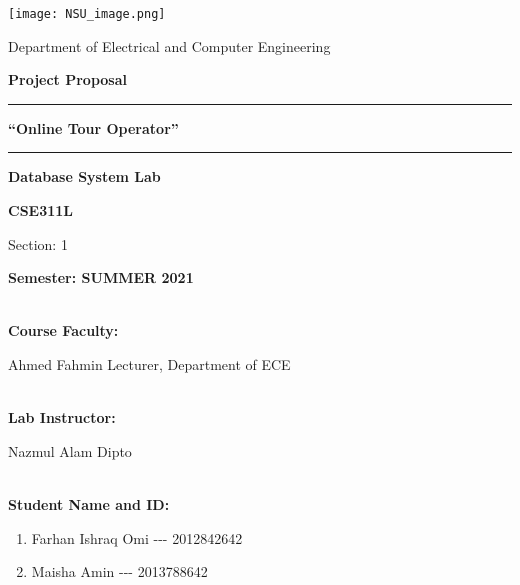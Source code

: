 \documentclass[]{article}
\date{}
\begin{document}
\begin{center}
    \texttt{[image: NSU\_image.png]} 
 \end{center}

\begin{center}   \end{center}

\begin{center} {\large Department of Electrical and Computer Engineering} \end{center}

\begin{center} \textbf{\large Project Proposal} \end{center}

 \rule{375}{1} 

\begin{center}\textbf{ \Large``Online Tour Operator''} \end{center}

 \rule{375}{1}

\begin{center}\textbf{ \large Database System Lab} \end{center}

\begin{center}\textbf { \large CSE311L} \end{center}

\begin{center} \large Section: 1 \end{center} 

\begin{center} \textbf{\large Semester: SUMMER 2021 } \end {center} 



\textbf{\large \\Course Faculty:}


 \large Ahmed Fahmin
\newline 
Lecturer, Department of ECE


\textbf{\\Lab Instructor:}

 Nazmul Alam Dipto


\textbf{\\Student Name and ID:}

\begin{enumerate}
\def\labelenumi{\arabic{enumi}.}
\item
  Farhan Ishraq Omi -\/-\/- 2012842642
\item
  Maisha Amin -\/-\/- 2013788642
  

\end{enumerate}
\end{document}

